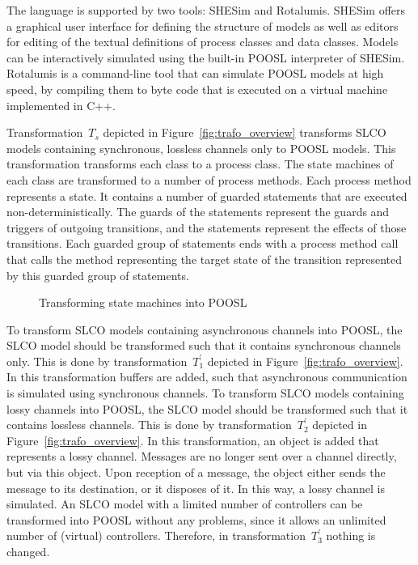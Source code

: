 The language is supported by two tools: SHESim and Rotalumis.
SHESim offers a graphical user interface for defining the structure of models as well as editors for editing of the textual definitions of process classes and data classes.
Models can be interactively simulated using the built-in POOSL interpreter of SHESim.
Rotalumis is a command-line tool that can simulate POOSL models at high speed, by compiling them to byte code that is executed on a virtual machine implemented in C++.

Transformation~$T_s$ depicted in Figure~\ref{fig:trafo_overview} transforms SLCO models containing synchronous, lossless channels only to POOSL models.
This transformation transforms each class to a process class.
The state machines of each class are transformed to a number of process methods.
Each process method represents a state.
It contains a number of guarded statements that are executed non-deterministically.
The guards of the statements represent the guards and triggers of outgoing transitions, and the statements represent the effects of those transitions.
Each guarded group of statements ends with a process method call that calls the method representing the target state of the transition represented by this guarded group of statements.

\begin{figure}[hbt]
\centering
{}
\hspace{.2\textwidth}
\caption{Transforming state machines into \textsc{POOSL}}
\label{fig:slco_poosl}
\end{figure}

To transform SLCO models containing asynchronous channels into POOSL, the SLCO model should be transformed such that it contains synchronous channels only.
This is done by transformation~$T_1^\prime$ depicted in Figure~\ref{fig:trafo_overview}.
In this transformation buffers are added, such that asynchronous communication is simulated using synchronous channels.
To transform SLCO models containing lossy channels into POOSL, the SLCO model should be transformed such that it contains lossless channels.
This is done by transformation~$T_2^\prime$ depicted in Figure~\ref{fig:trafo_overview}.
In this transformation, an object is added that represents a lossy channel.
Messages are no longer sent over a channel directly, but via this object.
Upon reception of a message, the object either sends the message to its destination, or it disposes of it.
In this way, a lossy channel is simulated.
An SLCO model with a limited number of controllers can be transformed into POOSL without any problems, since it allows an unlimited number of (virtual) controllers.
Therefore, in transformation~$T_3^\prime$ nothing is changed.

